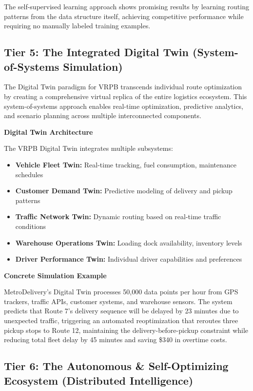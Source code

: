 \documentclass{article}
\begin{document}
The self-supervised learning approach shows promising results by learning routing patterns from the data structure itself, achieving competitive performance while requiring no manually labeled training examples.

\subsection{Tier 5: The Integrated Digital Twin (System-of-Systems Simulation)}

The Digital Twin paradigm for VRPB transcends individual route optimization by creating a comprehensive virtual replica of the entire logistics ecosystem. This system-of-systems approach enables real-time optimization, predictive analytics, and scenario planning across multiple interconnected components.

\textbf{Digital Twin Architecture}

The VRPB Digital Twin integrates multiple subsystems:
\begin{itemize}
\item \textbf{Vehicle Fleet Twin:} Real-time tracking, fuel consumption, maintenance schedules
\item \textbf{Customer Demand Twin:} Predictive modeling of delivery and pickup patterns
\item \textbf{Traffic Network Twin:} Dynamic routing based on real-time traffic conditions
\item \textbf{Warehouse Operations Twin:} Loading dock availability, inventory levels
\item \textbf{Driver Performance Twin:} Individual driver capabilities and preferences
\end{itemize}

\textbf{Concrete Simulation Example}

MetroDelivery's Digital Twin processes 50,000 data points per hour from GPS trackers, traffic APIs, customer systems, and warehouse sensors. The system predicts that Route 7's delivery sequence will be delayed by 23 minutes due to unexpected traffic, triggering an automated reoptimization that reroutes three pickup stops to Route 12, maintaining the delivery-before-pickup constraint while reducing total fleet delay by 45 minutes and saving \$340 in overtime costs.

\subsection{Tier 6: The Autonomous \& Self-Optimizing Ecosystem (Distributed Intelligence)}
\end{document}
